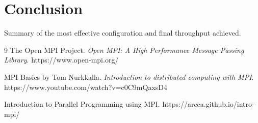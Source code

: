 \documentclass[11pt,a4paper]{article}
\begin{document}
	\section{Conclusion}
	Summary of the most effective configuration and final throughput achieved.
	
	\begin{thebibliography}{9}
		The Open MPI Project. \textit{Open MPI: A High Performance Message Passing Library}. https://www.open-mpi.org/
		
		 MPI Basics by Tom Nurkkalla. \textit{Introduction to distributed computing with MPI}. https://www.youtube.com/watch?v=c0C9mQaxsD4
		
		 Introduction to Parallel Programming using MPI. https://arcca.github.io/intro-mpi/
	\end{thebibliography}
	
	
\end{document}
